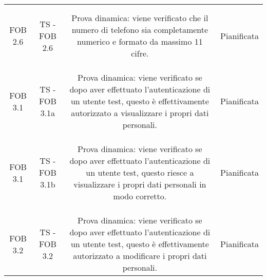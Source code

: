 {{{\begin{table}[h!]
\begin{center}
\begin{minipage}{1\linewidth}
\begin{tabular}{c c c c}
							\bottomrule
							\\\\
							FOB 2.6
							&
							TS - FOB 2.6			
							& 
							\begin{minipage}{0.55\linewidth}
								Prova dinamica: viene verificato che il numero di telefono
								sia completamente numerico e formato da massimo 11 cifre.
							\end{minipage}	
							&
							Pianificata
							\\
							\\
							\bottomrule
							\\\\
							FOB 3.1
							&
							TS - FOB 3.1a 			
							& 
							\begin{minipage}{0.55\linewidth}
								Prova dinamica: viene verificato se dopo aver effettuato
								l’autenticazione di un utente test, questo è effettivamente
								autorizzato a visualizzare i propri dati personali.
							\end{minipage}	
							&
							Pianificata
							\\
							\\
							\bottomrule
							\\\\
							FOB 3.1
							&
							TS - FOB 3.1b 			
							& 
							\begin{minipage}{0.55\linewidth}
								Prova dinamica: viene verificato se dopo aver effettuato
								l’autenticazione di un utente test, questo riesce a
								visualizzare i propri dati personali in modo corretto.
							\end{minipage}	
							&
							Pianificata
							\\
							\\
							\bottomrule
							\\\\
							FOB 3.2
							&
							TS - FOB 3.2			
							& 
							\begin{minipage}{0.55\linewidth}
								Prova dinamica: viene verificato se dopo aver effettuato
								l’autenticazione di un utente test, questo è effettivamente
								autorizzato a modificare i propri dati personali.
							\end{minipage}	
							&
							Pianificata
							
							\\  
							\bottomrule
							\end{tabular}
						\end{minipage}
				\end{center}	
			\end{table}
		}

}}
